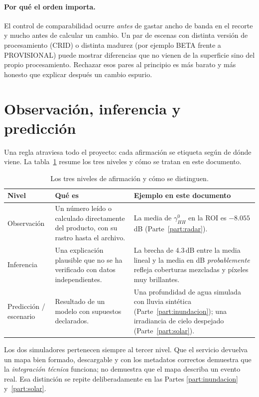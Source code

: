 \documentclass[11pt,a4paper]{article}
\begin{document}
\paragraph{Por qué el orden importa.} El control de comparabilidad ocurre \emph{antes} de gastar ancho de banda
en el recorte y mucho antes de calcular un cambio. Un par de escenas con distinta versión de procesamiento
(CRID) o distinta madurez (por ejemplo BETA frente a PROVISIONAL) puede mostrar diferencias que no vienen de
la superficie sino del propio procesamiento. Rechazar esos pares al principio es más barato y más honesto que
explicar después un cambio espurio.

\section{Observación, inferencia y predicción}
\label{sec:tres-niveles}

Una regla atraviesa todo el proyecto: cada afirmación se etiqueta según de dónde viene. La
tabla~\ref{tab:niveles} resume los tres niveles y cómo se tratan en este documento.

\begin{table}[htbp]
\centering\small
\begin{tabularx}{\linewidth}{p{.17\linewidth}p{.36\linewidth}X}
\toprule
\textbf{Nivel} & \textbf{Qué es} & \textbf{Ejemplo en este documento}\\\midrule
Observación & Un número leído o calculado directamente del producto, con su rastro hasta el archivo. &
La media de $\gamma^0_{HH}$ en la ROI es $-8.055$\,dB (Parte~\ref{part:radar}).\\
Inferencia & Una explicación plausible que no se ha verificado con datos independientes. &
La brecha de 4.3\,dB entre la media lineal y la media en dB \emph{probablemente} refleja coberturas mezcladas y píxeles muy brillantes.\\
Predicción / escenario & Resultado de un modelo con supuestos declarados. &
Una profundidad de agua simulada con lluvia sintética (Parte~\ref{part:inundacion}); una irradiancia de cielo despejado (Parte~\ref{part:solar}).\\\bottomrule
\end{tabularx}
\caption{Los tres niveles de afirmación y cómo se distinguen.}
\label{tab:niveles}
\end{table}

Los dos simuladores pertenecen siempre al tercer nivel. Que el servicio devuelva un mapa bien formado,
descargable y con los metadatos correctos demuestra que la \emph{integración técnica} funciona; no demuestra
que el mapa describa un evento real. Esa distinción se repite deliberadamente en las Partes
\ref{part:inundacion} y~\ref{part:solar}.
\end{document}
